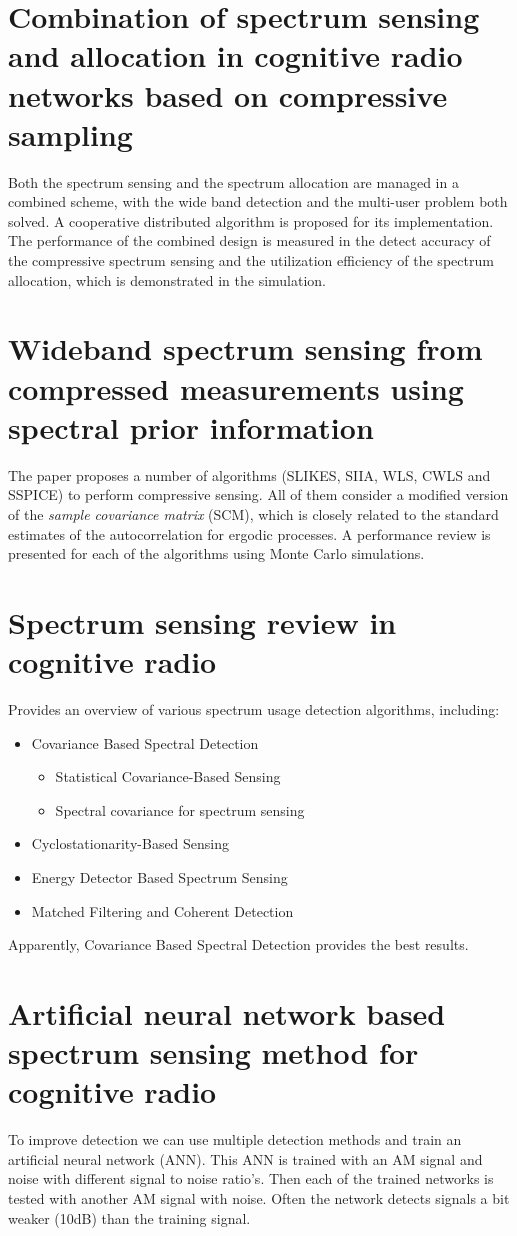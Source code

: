 \documentclass[report, oneside, a4paper, openany]{memoir}
\begin{document}
\section{Combination of spectrum sensing and allocation in cognitive radio networks based on compressive sampling \cite{qiao2011combination}}
Both the spectrum sensing and the spectrum allocation are managed in a combined scheme, with the wide band detection and the multi-user problem both solved.
A cooperative distributed algorithm is proposed for its implementation.
The performance of the combined design is measured in the detect accuracy of the compressive spectrum sensing and the utilization efficiency of the spectrum allocation, which is demonstrated in the simulation.
\section{Wideband spectrum sensing from compressed measurements using spectral prior information \cite{romero2013wideband}}
The paper proposes a number of algorithms (SLIKES, SIIA, WLS, CWLS and SSPICE) to perform compressive sensing. All of them consider a modified version of the \emph{sample covariance matrix} (SCM), which is closely related to the standard estimates of the autocorrelation for ergodic processes. A performance review is presented for each of the algorithms using Monte Carlo simulations.
\section{Spectrum sensing review in cognitive radio \cite{seshukumar2013spectrum}}
Provides an overview of various spectrum usage detection algorithms, including:
\begin{itemize}
	\item Covariance Based Spectral Detection
	\begin{itemize}
		\item Statistical Covariance-Based Sensing
		\item Spectral covariance for spectrum sensing
	\end{itemize}
	\item Cyclostationarity-Based Sensing
	\item Energy Detector Based Spectrum Sensing
	\item Matched Filtering and Coherent Detection
\end{itemize}
Apparently, Covariance Based Spectral Detection provides the best results.
\section{Artificial neural network based spectrum sensing method for cognitive radio \cite{tang2010artificial}}
%
To improve detection we can use multiple detection methods and train an artificial neural network (ANN). This ANN is trained with an AM signal and noise with different signal to noise ratio's. Then each of the trained networks is tested with another AM signal with noise. Often the network detects signals a bit weaker (10dB) than the training signal.
\end{document}
